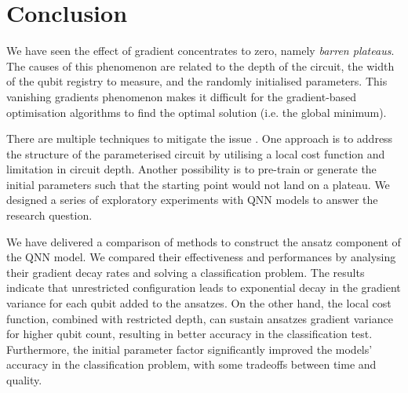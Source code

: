 \section{Conclusion}
We have seen the effect of gradient concentrates to zero, namely \emph{barren plateaus}.
The causes of this phenomenon are related to the depth of the circuit, the width of the qubit registry to measure, and the randomly initialised parameters.
This vanishing gradients phenomenon makes it difficult for the gradient-based optimisation algorithms to find the optimal solution (i.e. the global minimum).

There are multiple techniques to mitigate the issue \cite{cerezoCostFunctionDependent2021, skolikLayerwiseLearningQuantum2021, grantInitializationStrategyAddressing2019}.
One approach is to address the structure of the parameterised circuit by utilising a local cost function and limitation in circuit depth.
Another possibility is to pre-train or generate the initial parameters such that the starting point would not land on a plateau.
We designed a series of exploratory experiments with QNN models to answer the research question.

We have delivered a comparison of methods to construct the ansatz component of the QNN model.
We compared their effectiveness and performances by analysing their gradient decay rates and solving a classification problem.
The results indicate that unrestricted configuration leads to exponential decay in the gradient variance for each qubit added to the ansatzes.
On the other hand, the local cost function, combined with restricted depth, can sustain ansatzes gradient variance for higher qubit count, resulting in better accuracy in the classification test.
Furthermore, the initial parameter factor significantly improved the models' accuracy in the classification problem, with some tradeoffs between time and quality.



